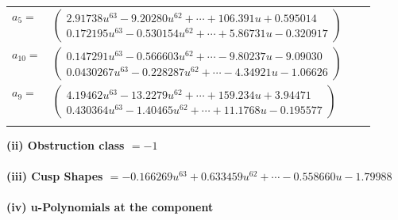 \documentclass[1p]{elsarticle_modified}
\theoremstyle{definition}
\begin{document}
\begin{tabular}{m{7pt} m{180pt} m{7pt} m{180pt} }
\flushright $a_{5}=$&$\begin{pmatrix}2.91738 u^{63}-9.20280 u^{62}+\cdots+106.391 u+0.595014\\0.172195 u^{63}-0.530154 u^{62}+\cdots+5.86731 u-0.320917\end{pmatrix}$ \\
\flushright $a_{10}=$&$\begin{pmatrix}0.147291 u^{63}-0.566603 u^{62}+\cdots-9.80237 u-9.09030\\0.0430267 u^{63}-0.228287 u^{62}+\cdots-4.34921 u-1.06626\end{pmatrix}$ \\
\flushright $a_{9}=$&$\begin{pmatrix}4.19462 u^{63}-13.2279 u^{62}+\cdots+159.234 u+3.94471\\0.430364 u^{63}-1.40465 u^{62}+\cdots+11.1768 u-0.195577\end{pmatrix}$\\&\end{tabular}
\flushleft \textbf{(ii) Obstruction class $= -1$}\\~\\
\flushleft \textbf{(iii) Cusp Shapes $= -0.166269 u^{63}+0.633459 u^{62}+\cdots-0.558660 u-1.79988$}\\~\\
\newpage\renewcommand{\arraystretch}{1}
\flushleft \textbf{(iv) u-Polynomials at the component}\newline \\
\end{document}
